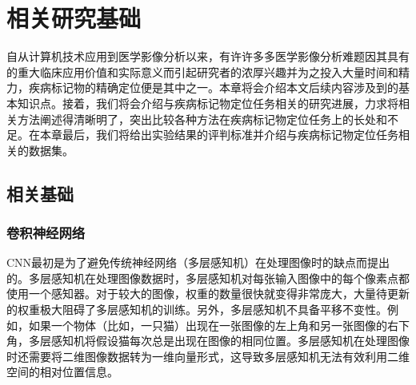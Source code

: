 \chapter{相关研究基础}
自从计算机技术应用到医学影像分析以来，有许许多多医学影像分析难题因其具有的重大临床应用价值和实际意义而引起研究者的浓厚兴趣并为之投入大量时间和精力，疾病标记物的精确定位便是其中之一。本章将会介绍本文后续内容涉及到的基本知识点。接着，我们将会介绍与疾病标记物定位任务相关的研究进展，力求将相关方法阐述得清晰明了，突出比较各种方法在疾病标记物定位任务上的长处和不足。在本章最后，我们将给出实验结果的评判标准并介绍与疾病标记物定位任务相关的数据集。
\section{相关基础}
\subsection{卷积神经网络}\label{subsec:cnn_introduction}
CNN最初是为了避免传统神经网络（多层感知机）在处理图像时的缺点而提出的。多层感知机在处理图像数据时，多层感知机对每张输入图像中的每个像素点都使用一个感知器。对于较大的图像，权重的数量很快就变得非常庞大，大量待更新的权重极大阻碍了多层感知机的训练。另外，多层感知机不具备平移不变性。例如，如果一个物体（比如，一只猫）出现在一张图像的左上角和另一张图像的右下角，多层感知机将假设猫每次总是出现在图像的相同位置。多层感知机在处理图像时还需要将二维图像数据转为一维向量形式，这导致多层感知机无法有效利用二维空间的相对位置信息。

